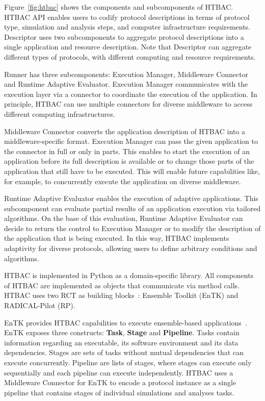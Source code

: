 Figure~\ref{fig:htbac} shows the components and subcomponents of HTBAC.
HTBAC API enables users to codify protocol descriptions in terms of protocol
type, simulation and analysis steps, and computer infrastructure
requirements. Descriptor uses two subcomponents to aggregate protocol
descriptions into a single application and resource description. Note that
Descriptor can aggregate different types of protocols, with different
computing and resource requirements.

Runner has three subcomponents: Execution Manager, Middleware Connector and
Runtime Adaptive Evaluator. Execution Manager communicates with the
execution layer via a connector to coordinate the execution of the
application. In principle, HTBAC can use multiple connectors for diverse
middleware to access different computing infrastructures.

Middleware Connector converts the application description of HTBAC into a
middleware-specific format. Execution Manager can pass the given application
to the connector in full or only in parts. This enables to start the
execution of an application before its full description is available or to
change those parts of the application that still have to be executed. This
will enable future capabilities like, for example, to concurrently execute
the application on diverse middleware.

Runtime Adaptive Evaluator enables the execution of adaptive applications.
This subcomponent can evaluate partial results of an application execution
via tailored algorithms. On the base of this evaluation, Runtime Adaptive
Evaluator can decide to return the control to Execution Manager or to modify
the description of the application that is being executed. In this way, HTBAC
implements adaptivity for diverse protocols, allowing users to define
arbitrary conditions and algorithms.

HTBAC is implemented in Python as a domain-specific library. All components
of HTBAC are implemented as objects that communicate via method calls. HTBAC
uses two RCT as building blocks~\cite{review_bb_2016}: Ensemble Toolkit
(EnTK) and RADICAL-Pilot (RP).

EnTK provides HTBAC capabilities to execute ensemble-based
applications~\cite{power-of-many17}. EnTK exposes three constructs:
\textbf{Task}, \textbf{Stage} and \textbf{Pipeline}. Tasks contain
information regarding an executable, its software environment and its data
dependencies. Stages are sets of tasks without mutual dependencies that can
execute concurrently. Pipeline are lists of stages, where stages can execute
only sequentially and each pipeline can execute independently. HTBAC uses a
Middleware Connector for EnTK to encode a protocol instance as a single
pipeline that contains stages of individual simulations and analyses tasks.

